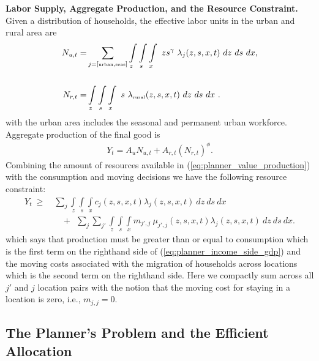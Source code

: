 \documentclass[12pt,pdftex]{article}
\begin{document}
\begin{onehalfspacing}
\textbf{Labor Supply, Aggregate Production, and the Resource Constraint.} Given a distribution of households, the effective labor units in the urban and rural area are
\begin{align}
N_{u,t} =& \sum_{j = [\mbox{\tiny urban}, \mbox{\tiny seas}]}\int\limits_{z} \int\limits_{s} \int\limits_{x} \  z s^{\gamma} \ \lambda_j(z, s, x, t) \ dz \ ds \ dx, \nonumber
\\
\nonumber \\
N_{r,t} =& \int\limits_{z} \int\limits_{s} \int\limits_{x} \ s \ \lambda_{\mbox{\tiny rural}}(z, s, x, t)\ dz \ ds \ dx \ .
\label{eq:planner_labor_supply}
\end{align}
with the urban area includes the seasonal and permanent urban workforce. Aggregate production of the final good is
\begin{align}
Y_t = A_u N_{u,t} + A_{r,t} \left(N_{r,t} \right)^{\phi}.
\label{eq:planner_value_production}
\end{align}
Combining the amount of resources available in (\ref{eq:planner_value_production}) with the consumption and moving decisions we have the following resource constraint:
\begin{align}
Y_t\  \geq \ & \sum_{j} \int\limits_{z} \int\limits_{s} \int\limits_{x} c_{j}(z, s, x, t) \lambda_{j}(z, s, x, t) \ dz \ ds \ dx  \nonumber \\
& \ \ \ \ +  \ \  \sum_{j}\sum_{j'} \int\limits_{z} \int\limits_{s} \int\limits_{x}  m_{j',j} \ \mu_{j',j}(z,s, x, t) \lambda_{j}(z, s, x, t) \ dz \ ds \ dx.
\label{eq:planner_income_side_gdp}
\end{align}
which says that production must be greater than or equal to consumption which is the first term on the righthand side of (\ref{eq:planner_income_side_gdp}) and the moving costs associated with the migration of households across locations which is the second term on the righthand side. Here we compactly sum across all $j'$ and $j$ location pairs with the notion that the moving cost for staying in a location is zero, i.e., $m_{j,j} = 0$.

\subsection{The Planner's Problem and the Efficient Allocation}


\end{onehalfspacing}
\end{document}
